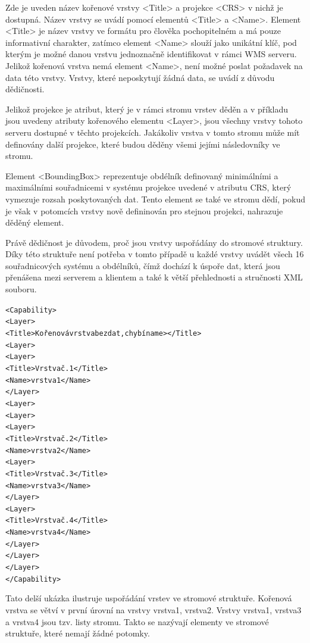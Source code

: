 \documentclass[a4paper,12pt]{article}
\begin{document}
Zde je uveden název kořenové vrstvy <Title> a projekce <CRS> v nichž je dostupná. Název vrstvy se uvádí pomocí elementů <Title> a <Name>. Element
<Title> je název vrstvy ve formátu pro člověka pochopitelném a má pouze informativní charakter, zatímco element <Name> slouží jako unikátní klíč, 
pod kterým je možné danou vrstvu jednoznačně identifikovat v rámci WMS serveru. Jelikož kořenová vrstva nemá element <Name>, není možné poslat požadavek na data této vrstvy. Vrstvy, které neposkytují 
žádná data, se uvádí z důvodu dědičnosti. 

Jelikož projekce je atribut, který je v rámci stromu vrstev děděn a v příkladu jsou uvedeny atributy kořenového elementu <Layer>, jsou všechny vrstvy tohoto serveru dostupné v těchto projekcích.
Jakákoliv vrstva v tomto stromu může mít definovány další projekce, které budou děděny všemi jejími následovníky ve stromu. 

Element <BoundingBox> reprezentuje obdélník definovaný minimálními a maximálními souřadnicemi v systému projekce uvedené v atributu CRS, který vymezuje rozsah poskytovaných dat. 
Tento element se také ve stromu dědí, pokud je však v potomcích vrstvy nově defininován pro stejnou projekci, nahrazuje děděný element.

 Právě dědičnost je důvodem, proč jsou vrstvy uspořádány do stromové struktury. Díky této struktuře není potřeba v tomto případě u každé vrstvy
uvádět všech 16 souřadnicových systému a obdélníků, čímž dochází k úspoře dat, která jsou přenášena mezi serverem a klientem a také k větší přehlednosti a stručnosti XML souboru.

\newpage

\begin{alltt}\footnotesize
<Capability>
  <Layer>
    <Title>Kořenová vrstva bez dat, chybí name></Title>
    <Layer>
      <Layer>
        <Title>Vrstva č. 1</Title>
        <Name>vrstva1</Name>
      </Layer>
    <Layer>
    <Layer>
      <Layer>
        <Title>Vrstva č. 2</Title>
        <Name>vrstva2</Name>
        <Layer>
          <Title>Vrstva č. 3</Title>
          <Name>vrstva3</Name>
        </Layer>
        <Layer>
          <Title>Vrstva č. 4</Title>
          <Name>vrstva4</Name>
        </Layer>
      </Layer>
    </Layer>
</Capability>
\end{alltt}



Tato delší ukázka ilustruje uspořádání vrstev ve stromové struktuře. Kořenová vrstva se větví v první úrovní  na vrstvy vrstva1, 
vrstva2. Vrstvy vrstva1, vrstva3 a vrstva4 jsou tzv. listy stromu. Takto se nazývají elementy ve stromové struktuře, které nemají žádné potomky. 
\end{document}
